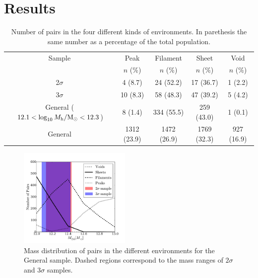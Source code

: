 \documentclass{emulateapj}
\newcommand{\Msun}{{\ifmmode{{\rm {M_{\odot}}}}\else{${\rm{M_{\odot}}}$}\fi}}
\begin{document}

\section{Results}
\label{sec:results}

\begin{table}
\begin{center}
\begin{tabular}{ccccc}\hline\hline
Sample & Peak & Filament & Sheet & Void\\
       & $n$ (\%) & $n$ (\%) & $n$ (\%) & $n$ (\%) \\\hline
2$\sigma$ & 4 (8.7) & 24 (52.2) &  17 (36.7) & 1 (2.2)\\
3$\sigma$ & 10 (8.3) & 58 (48.3) & 47 (39.2) & 5 (4.2)\\  
General ($12.1<\log_{10} M_{\rm h}/\Msun<12.3$)& 8 (1.4) & 334 (55.5) & 259
(43.0) & 1 (0.1)\\
General & 1312 (23.9) & 1472 (26.9) & 1769 (32.3) & 927 (16.9)\\

\hline\hline
\end{tabular}
\caption{
Number of pairs in the four different kinds of environments. In
parethesis the same number as a percentage of the
total population.
\label{table:web_type}}
\end{center}
\end{table}


\begin{figure}
\begin{center}
  \includegraphics[width=0.48\textwidth]{histogram_mass_distro.pdf}
\caption{Mass distribution of pairs in the different environments
for the General sample.
Dashed regions correspond to the mass ranges of $2\sigma$ and $3\sigma$ samples.
\label{fig:median_fraction}}
\end{center}
\end{figure}
\end{document}
